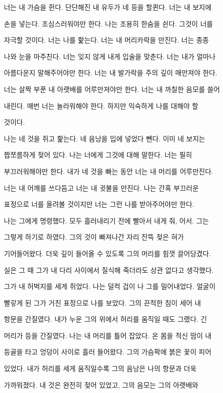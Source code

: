 너는 내 가슴을 쥔다. 단단해진 내 유두가 네 등을 할퀸다. 너는 내 보지에

손을 넣는다. 조심스러워야만 한다. 나는 조용히 한숨을 쉰다. 그것이 너를

자극할 것이다. 너는 나를 핥는다. 너는 내 머리카락을 만진다. 너는 종종

나와 눈을 마주친다. 너는 잊지 않게 내게 입술을 맞춘다. 너는 내가 얼마나

아름다운지 말해주어야만 한다. 너는 내 발가락을 주의 깊이 매만져야 한다.

너는 살짝 부푼 내 아랫배를 어루만져야만 한다. 너는 내 까칠한 음모를 쓸어

내린다. 매번 너는 놀라워해야 한다. 하지만 익숙하게 나를 대해야 할

것이다.



나는 네 것을 쥐고 핥는다. 네 음낭을 입에 넣었다 뺀다. 이미 네 보지는

짭쪼름하게 젖어 있다. 나는 너에게 그것에 대해 말한다. 너는 필히

부끄러워해야만 한다. 내가 네 것을 빠는 동안 너는 내 머리를 어루만진다.

너는 내 어깨를 쓰다듬고 너는 내 귓불을 만진다. 나는 간혹 부끄러운

표정으로 너를 올려볼 것이지만 너는 그런 나를 받아주어야만 한다.



나는 그에게 명령했다. 모두 흘러내리기 전에 빨아서 내게 줘, 어서. 그는

그렇게 하기로 하였다. 그의 것이 빠져나간 자리 잔뜩 젖은 혀가

기어들어왔다. 더욱 깊이 들어올 수 있도록 그의 머리를 힘껏 끌어당겼다.

실은 그 때 그가 내 다리 사이에서 질식해 죽더라도 상관 없다고 생각했다.

그가 내 허벅지를 세게 쥐었다. 나는 덜컥 겁이 나 그를 밀어내었다. 얼굴이

빨갛게 된 그가 거친 표정으로 나를 보았다. 그의 끈적한 침이 세어 내

항문을 간질였다. 내가 누운 그의 위에서 허리를 움직일 때도 그랬다. 긴

머리가 등을 간질였다. 나는 내 머리를 틀어 잡았다. 온 몸을 적신 땀이 내

등골을 타고 엉덩이 사이로 흘러 들어왔다. 그의 가슴팍에 붉은 꽃이 피어

있었다. 내가 허리를 세게 움직일수록 그의 음낭은 나의 항문과 더욱

가까워졌다. 내 것은 완전히 젖어 있었고, 그의 음모는 그의 아랫배와

